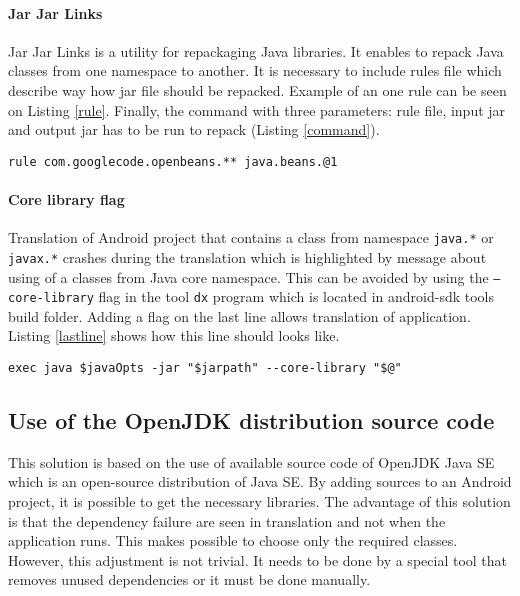 \paragraph{Jar Jar Links}
Jar Jar Links \cite{JarJar} is a utility for repackaging Java libraries. It enables to repack Java classes from one namespace to another. It is necessary to include rules file which describe way how jar file should be repacked. Example of an one rule can be seen on Listing \ref{rule}. Finally, the command with three parameters: rule file, input jar and output jar has to be run to repack (Listing \ref{command}). 
\\
\begin{lstlisting}[captionpos={b},caption={Jar Jar Links rule for repacking OpenBeans to Java core namespace},frame={lines},label={rule},basicstyle=\footnotesize]
rule com.googlecode.openbeans.** java.beans.@1
\end{lstlisting}

\paragraph{Core library flag}
Translation of Android project that contains a class from namespace \texttt{java.*} or \texttt{javax.*} crashes during the translation which is highlighted by message about using of a classes from Java core namespace. This can be avoided by using the \texttt{--core-library} flag in the tool \texttt{dx} program which is located in android-sdk tools build folder. Adding a flag on the last line allows translation of application. Listing \ref{lastline} shows how this line should looks like.
\\
\begin{lstlisting}[captionpos={b},caption={Spanning tree broadcast algorithm.},frame={lines},label={lastline},basicstyle=\footnotesize]
exec java $javaOpts -jar "$jarpath" --core-library "$@"
\end{lstlisting}

\subsection{Use of the OpenJDK distribution source code}
This solution is based on the use of available source code of OpenJDK Java SE \cite{OpenJDK} which is an open-source distribution of Java SE. By adding sources to an Android project, it is possible to get the necessary libraries. The advantage of this solution is that the dependency failure are seen in translation and not when the application runs. This makes possible to choose only the required classes. However, this adjustment is not trivial. It needs to be done by a special tool that removes unused dependencies or it must be done manually.

